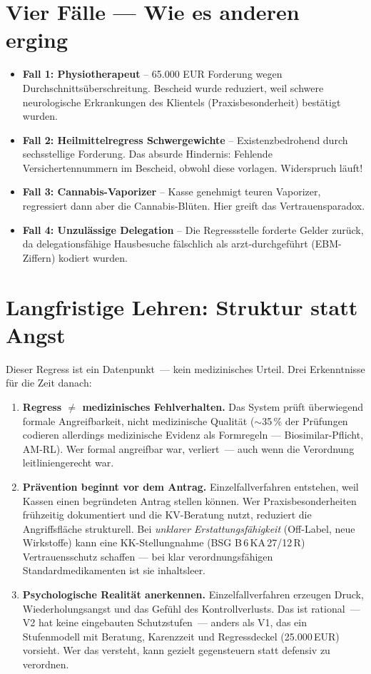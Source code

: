 \documentclass[a4paper]{umbruch-position}
\begin{document}
\section{Vier F\"alle --- Wie es anderen erging}

\begin{itemize}
    \item \textbf{Fall 1: Physiotherapeut} -- 65.000 EUR Forderung wegen Durchschnitts\"uberschreitung. Bescheid wurde reduziert, weil schwere neurologische Erkrankungen des Klientels (Praxisbesonderheit) best\"atigt wurden.
    \item \textbf{Fall 2: Heilmittelregress Schwergewichte} -- Existenzbedrohend durch sechsstellige Forderung. Das absurde Hindernis: Fehlende Versichertennummern im Bescheid, obwohl diese vorlagen. Widerspruch läuft!
    \item \textbf{Fall 3: Cannabis-Vaporizer} -- Kasse genehmigt teuren Vaporizer, regressiert dann aber die Cannabis-Bl\"uten. Hier greift das Vertrauensparadox. 
    \item \textbf{Fall 4: Unzul\"assige Delegation} -- Die Regressstelle forderte Gelder zur\"uck, da delegationsf\"ahige Hausbesuche f\"alschlich als arzt-durchgef\"uhrt (EBM-Ziffern) kodiert wurden.
\end{itemize}

\section{Langfristige Lehren: Struktur statt Angst}

Dieser Regress ist ein Datenpunkt~--- kein medizinisches Urteil. Drei Erkenntnisse f\"ur die Zeit danach:

\begin{enumerate}
    \item \textbf{Regress $\neq$ medizinisches Fehlverhalten.} Das System pr\"uft \"uberwiegend formale Angreifbarkeit, nicht medizinische Qualit\"at (${\sim}$35\,\% der Pr\"ufungen codieren allerdings medizinische Evidenz als Formregeln --- Biosimilar-Pflicht, AM-RL). Wer formal angreifbar war, verliert~--- auch wenn die Verordnung leitliniengerecht war.
    \item \textbf{Pr\"avention beginnt vor dem Antrag.} Einzelfallverfahren entstehen, weil Kassen einen begr\"undeten Antrag stellen k\"onnen. Wer Praxisbesonderheiten fr\"uhzeitig dokumentiert und die KV-Beratung nutzt, reduziert die Angriffsfl\"ache strukturell. Bei \textit{unklarer Erstattungsf\"ahigkeit} (Off-Label, neue Wirkstoffe) kann eine KK-Stellungnahme (BSG B\,6\,KA\,27/12\,R) Vertrauensschutz schaffen --- bei klar verordnungsf\"ahigen Standardmedikamenten ist sie inhaltsleer.
    \item \textbf{Psychologische Realit\"at anerkennen.} Einzelfallverfahren erzeugen Druck, Wiederholungsangst und das Gef\"uhl des Kontrollverlusts. Das ist rational~--- V2 hat keine eingebauten Schutzstufen~--- anders als V1, das ein Stufenmodell mit Beratung, Karenzzeit und Regressdeckel (25.000\,EUR) vorsieht. Wer das versteht, kann gezielt gegensteuern statt defensiv zu verordnen.
\end{enumerate}
\end{document}
